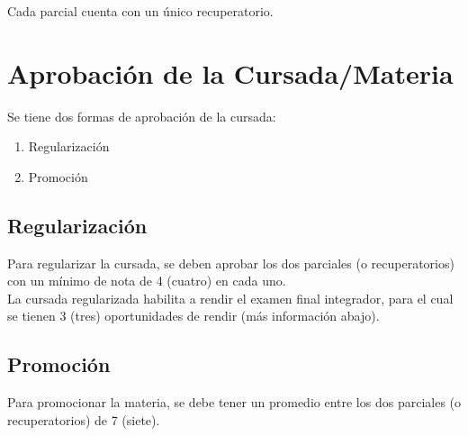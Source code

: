 \documentclass[
  letterpaper,
  DIV=11,
  numbers=noendperiod]{scrreprt}
\providecommand{\tightlist}{%
  \setlength{\itemsep}{0pt}\setlength{\parskip}{0pt}}\usepackage{longtable,booktabs,array}
\begin{document}
Cada parcial cuenta con un único recuperatorio.

\section*{Aprobación de la
Cursada/Materia}\label{aprobaciuxf3n-de-la-cursadamateria}


Se tiene dos formas de aprobación de la cursada:

\begin{enumerate}
\def\labelenumi{\arabic{enumi}.}
\tightlist
\item
  Regularización
\item
  Promoción
\end{enumerate}

\subsection*{Regularización}\label{regularizaciuxf3n}

Para regularizar la cursada, se deben aprobar los dos parciales (o
recuperatorios) con un mínimo de nota de 4 (cuatro) en cada uno.\\

La cursada regularizada habilita a rendir el examen final integrador,
para el cual se tienen 3 (tres) oportunidades de rendir (más información
abajo).

\subsection*{Promoción}\label{promociuxf3n}

Para promocionar la materia, se debe tener un promedio entre los dos
parciales (o recuperatorios) de 7 (siete).\\
\end{document}
